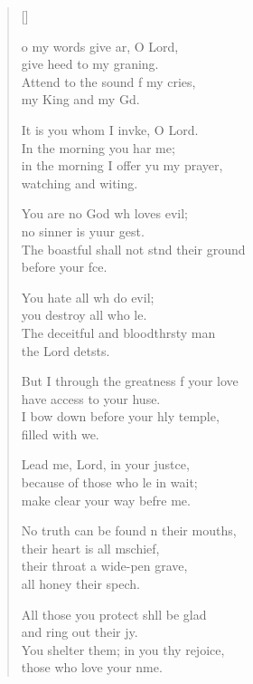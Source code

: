 \settowidth{\versewidth}{you surround him with favour as with a shield.}
\begin{verse}[\versewidth]
  \begin{patverse}
    o my words give ar, O Lord,\Med\\
    give heed to my graning.\\
    Attend to the sound f my cries,\Med\\
    my King and my Gd.

It is you whom I invke, O Lord.\Med\\
    In the morning you har me;\\
in the morning I offer yu my prayer,\Med\\
    watching and witing.

You are no God wh loves evil;\Med\\
    no sinner is yuur gest.\\
The boastful shall not stnd their ground\Med\\
    before your fce.

You hate all wh do evil;\Med\\
    you destroy all who l\pointup{\i}e.\\
The deceitful and bloodth\pointup{\i}rsty man\Med\\
    the Lord detsts.

But I through the greatness f your love\Med\\
    have access to your huse.\\
I bow down before your hly temple,\Med\\
    filled with we.

Lead me, Lord, in your just\pointup{\i}ce,\Flex\\
    because of those who l\pointup{\i}e in wait;\Med\\
    make clear your way befre me.

No truth can be found \pointup{\i}n their mouths,\Med\\
    their heart is all m\pointup{\i}schief,\\
their throat a wide-pen grave,\Med\\
    all honey their spech.

All those you protect shll be glad\Med\\
    and ring out their jy.\\
You shelter them; in you thy rejoice,\Med\\
    those who love your nme.


\end{patverse}
\end{verse}
